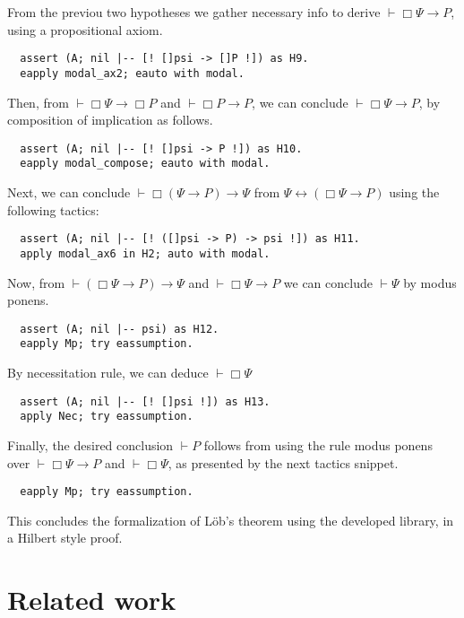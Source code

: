 \documentclass[sigconf]{acmart}
\begin{document}
\noindent From the previou two hypotheses we gather necessary info to derive
$\vdash \Box \Psi \to P$, using a propositional axiom.

\begin{verbatim}
  assert (A; nil |-- [! []psi -> []P !]) as H9.
  eapply modal_ax2; eauto with modal.
\end{verbatim}

\noindent Then, from $\vdash \Box\Psi \to \Box P$ and $\vdash \Box P \to P$, we can
conclude $\vdash \Box \Psi \to P$, by composition of implication as
follows.

\begin{verbatim}
  assert (A; nil |-- [! []psi -> P !]) as H10.
  eapply modal_compose; eauto with modal.
\end{verbatim}

\noindent Next, we can conclude $\vdash \Box (\Psi \to P) \to \Psi$ from
$\Psi \leftrightarrow (\Box \Psi \to P)$ using
the following tactics:

\begin{verbatim}
  assert (A; nil |-- [! ([]psi -> P) -> psi !]) as H11.
  apply modal_ax6 in H2; auto with modal.
\end{verbatim}

\noindent Now, from $\vdash (\Box\Psi \to P) \to \Psi$ and $\vdash \Box \Psi \to P$
we can conclude $\vdash \Psi$ by modus ponens.

\begin{verbatim}
  assert (A; nil |-- psi) as H12.
  eapply Mp; try eassumption.
\end{verbatim}

\noindent By necessitation rule, we can deduce $\vdash \Box \Psi$

\begin{verbatim}
  assert (A; nil |-- [! []psi !]) as H13.
  apply Nec; try eassumption.
\end{verbatim}

\noindent Finally, the desired conclusion $\vdash P$ follows from
using the rule modus ponens over $\vdash \Box \Psi \to P$
and $\vdash \Box \Psi$, as presented by the next tactics
snippet.

\begin{verbatim}
  eapply Mp; try eassumption.
\end{verbatim}

\noindent This concludes the formalization of L\"ob's theorem using
the developed library, in a Hilbert style proof.

\section{Related work}\label{sec:related}
\end{document}

